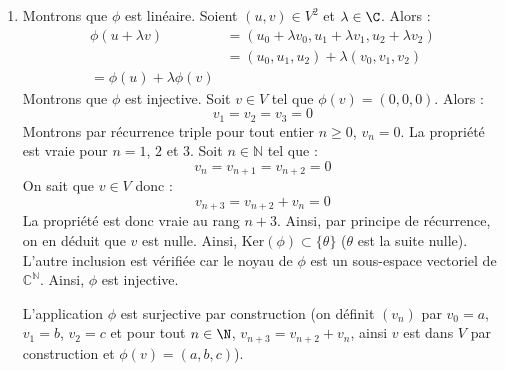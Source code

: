 \documentclass[a4paper,10pt]{report}
\begin{document}
\begin{enumerate}
 \item Montrons que $\phi$ est linéaire. Soient $(u,v)\in V^2$ et $\lambda\in\C$. Alors :
 \begin{align*}
\phi(u+\lambda v) & =(u_0+\lambda v_0,u_1+\lambda v_1,u_2+\lambda v_2) \\
& =(u_0,u_1,u_2)+\lambda(v_0,v_1,v_2) \\
=\phi(u)+\lambda\phi(v)
\end{align*}
Montrons que $\phi$ est injective. Soit $v \in V$ tel que $\phi(v)=(0,0,0)$. Alors :
$$ v_1=v_2=v_3=0$$
Montrons par récurrence triple pour tout entier $n \geq 0$, $v_n=0$. La propriété est vraie pour $n=1$, $2$ et $3$. Soit $n \in \mathbb{N}$ tel que :
$$ v_n=v_{n+1}=v_{n+2} = 0$$
On sait que $v \in V$ donc :
$$ v_{n+3}=v_{n+2}+v_n = 0 $$
La propriété est donc vraie au rang $n+3$. Ainsi, par principe de récurrence, on en déduit que $v$ est nulle. Ainsi, $\textrm{Ker}(\phi) \subset \lbrace \theta \rbrace$ ($\theta$ est la suite nulle). L'autre inclusion est vérifiée car le noyau de $\phi$ est un sous-espace vectoriel de $\mathbb{C}^{\mathbb{N}}$. Ainsi, $\phi$ est injective.


\medskip

\noindent L'application $\phi$ est surjective par construction (on définit $(v_n)$ par $v_0=a$, $v_1=b$, $v_2=c$ et pour tout $n\in\N$, $v_{n+3}=v_{n+2}+v_n$, ainsi $v$ est dans $V$ par construction et $\phi(v)=(a,b,c)$). 

\medskip



\end{enumerate}
\end{document}
